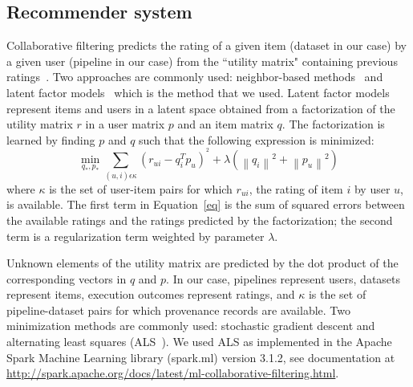 \documentclass[conference]{IEEEtran}
\begin{document}
\subsection{Recommender system}

Collaborative filtering predicts the rating of a given item (dataset in our
case) by a given user (pipeline in our case) from the ``utility
matrix" containing previous ratings~\cite{rajaraman2011mining}.
Two  approaches are commonly used: neighbor-based
methods~\cite{koren2015advances} and latent factor
models~\cite{koren2009matrix,bokde2015matrix} which is the method that we used. Latent factor models represent items and
users in a latent space obtained from a factorization of the
utility matrix $r$ in a user matrix $p$ and an item matrix $q$. The
factorization is learned by finding $p$ and $q$ such that the following expression is minimized:
\begin{equation} \tag{1}
   \min_{q_{*},p_{*}} \sum_{(u,i) \epsilon \kappa }  (r_{ui}-q_{i}^{T}p_{u})^{^2}+\lambda \left ( \left \| q_{i}\right \|^2+\left \| p_{u}\right \|^2 \right )            \label{eq}
\end{equation}
where $\kappa$ is the set of user-item pairs for which $r_{ui}$, the rating of item
$i$ by user $u$, is available. The first term in Equation~\ref{eq} is the sum of squared errors between the
available ratings and the ratings predicted by the factorization; the second term is a regularization term weighted by parameter $\lambda$.


Unknown elements of the utility matrix are
predicted by the dot product of the corresponding vectors in $q$ and $p$.
In our case, pipelines represent users, datasets represent items, execution
outcomes represent ratings, and $\kappa$ is the set of pipeline-dataset
pairs for which provenance records are available. Two minimization methods are
commonly used: stochastic gradient descent and alternating least squares
(ALS~\cite{koren2009matrix}). We used ALS as implemented in the
Apache Spark Machine Learning library (spark.ml) version 3.1.2, see documentation at \url{http://spark.apache.org/docs/latest/ml-collaborative-filtering.html}. 


\end{document}
